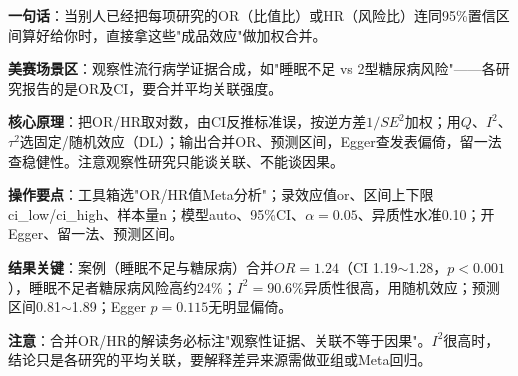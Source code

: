 
\begin{algobrief}
\textbf{一句话}：当别人已经把每项研究的OR（比值比）或HR（风险比）连同95\%置信区间算好给你时，直接拿这些"成品效应"做加权合并。

\textbf{美赛场景区}：观察性流行病学证据合成，如"睡眠不足 vs 2型糖尿病风险"——各研究报告的是OR及CI，要合并平均关联强度。

\textbf{核心原理}：把OR/HR取对数，由CI反推标准误，按逆方差$1/SE^2$加权；用$Q$、$I^2$、$\tau^2$选固定/随机效应（DL）；输出合并OR、预测区间，Egger查发表偏倚，留一法查稳健性。注意观察性研究只能谈关联、不能谈因果。

\textbf{操作要点}：工具箱选"OR/HR值Meta分析"；录效应值or、区间上下限ci\_low/ci\_high、样本量n；模型auto、95\%CI、$\alpha=0.05$、异质性水准0.10；开Egger、留一法、预测区间。

\textbf{结果关键}：案例（睡眠不足与糖尿病）合并$OR=1.24$（CI 1.19$\sim$1.28，$p<0.001$），睡眠不足者糖尿病风险高约24\%；$I^2=90.6\%$异质性很高，用随机效应；预测区间0.81$\sim$1.89；Egger $p=0.115$无明显偏倚。

\textbf{注意}：合并OR/HR的解读务必标注"观察性证据、关联不等于因果"。$I^2$很高时，结论只是各研究的平均关联，要解释差异来源需做亚组或Meta回归。
\end{algobrief}
